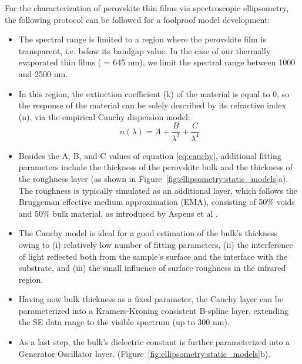 For the characterization of perovskite thin films via spectroscopic ellipsometry, the following protocol can be followed for a foolproof model development: 
\begin{itemize}
    \item The spectral range is limited to a region where the perovskite film is transparent, i.e. below its bandgap value. In the case of our thermally evaporated  thin films ( = 645 nm), we limit the spectral range between 1000 and 2500 nm. 
    \item In this region, the extinction coefficient (k) of the material is equal to 0, so the response of the material can be solely described by its refractive index (n), via the empirical Cauchy dispersion model:
        \begin{equation}
            n(\lambda) = A + \frac{B}{\lambda^2} + \frac{C}{\lambda^4}
            \label{eq:cauchy}
        \end{equation}
    \item Besides the A, B, and C values of equation \ref{eq:cauchy}, additional fitting parameters include the thickness of the perovskite bulk and the thickness of the roughness layer (as shown in Figure~\ref{fig:ellipsometry:static_models}a). The roughness is typically simulated as an additional layer, which follows the Bruggeman effective medium approximation (EMA), consisting of 50\% voids and 50\% bulk material, as introduced by Aspens et al \cite{Aspnes1979InvestigationEllipsometry}. 

    \item The Cauchy model is ideal for a good estimation of the bulk's thickness owing to (i) relatively low number of fitting parameters, (ii) the interference of light reflected both from the sample's surface and the interface with the substrate, and (iii) the small influence of surface roughness in the infrared region.

    \item Having now bulk thickness as a fixed parameter, the Cauchy layer can be parameterized into a Kramers-Kroning consistent B-spline layer, extending the SE data range to the visible spectrum (up to 300 nm). 

    \item As a last step, the bulk's dielectric constant is further parameterized into a Generator Oscillator layer. (Figure~\ref{fig:ellipsometry:static_models}b).    

\end{itemize}

